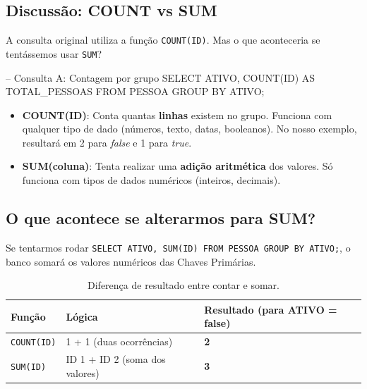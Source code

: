 \documentclass[12pt,a4paper,openright]{book}
\begin{document}
\subsection{Discussão: COUNT vs SUM}

A consulta original utiliza a função \texttt{COUNT(ID)}. Mas o que aconteceria se tentássemos usar \texttt{SUM}?



\begin{sqlcode}
-- Consulta A: Contagem por grupo
SELECT ATIVO, COUNT(ID) AS TOTAL_PESSOAS 
FROM PESSOA 
GROUP BY ATIVO;
\end{sqlcode}

\begin{tcolorbox}[colback=red!5,colframe=red!75!black,title=Conceito Fundamental]
\begin{itemize}
    \item \textbf{COUNT(ID)}: Conta quantas \textbf{linhas} existem no grupo. Funciona com qualquer tipo de dado (números, texto, datas, booleanos). No nosso exemplo, resultará em 2 para \textit{false} e 1 para \textit{true}.
    \item \textbf{SUM(coluna)}: Tenta realizar uma \textbf{adição aritmética} dos valores. Só funciona com tipos de dados numéricos (inteiros, decimais).
\end{itemize}
\end{tcolorbox}

\subsection{O que acontece se alterarmos para SUM?}

Se tentarmos rodar \texttt{SELECT ATIVO, SUM(ID) FROM PESSOA GROUP BY ATIVO;}, o banco somará os valores numéricos das Chaves Primárias.

\begin{table}[H]
    \centering
    \begin{tabular}{|l|l|l|}
    \hline
    \textbf{Função} & \textbf{Lógica} & \textbf{Resultado (para ATIVO = false)} \\ \hline
    \texttt{COUNT(ID)} & 1 + 1 (duas ocorrências) & \textbf{2} \\ \hline
    \texttt{SUM(ID)} & ID 1 + ID 2 (soma dos valores) & \textbf{3} \\ \hline
    \end{tabular}
    \caption{Diferença de resultado entre contar e somar.}
\end{table}
\end{document}

